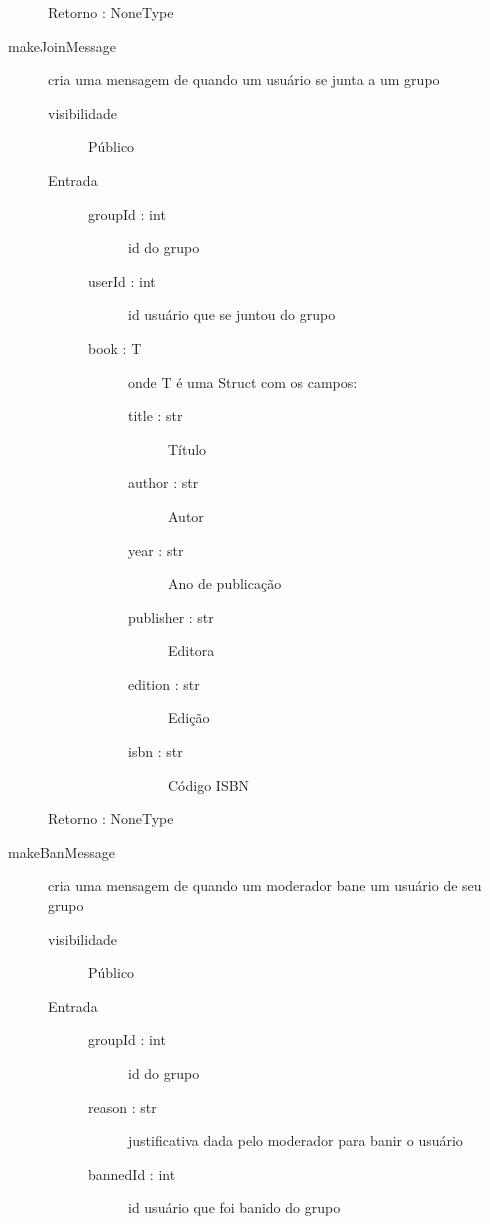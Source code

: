 \documentclass[a4paper]{article}
\begin{document}
\begin{description}
\begin{description}
				\item [Retorno : NoneType]
			\end{description} %
			
			\item [makeJoinMessage] cria uma mensagem de quando um usuário se junta a um grupo
			\begin{description} %
				\item [visibilidade] Público
				\item [Entrada] \mbox{}
					\begin{description}
					 \item [groupId : int] id do grupo
					 \item [userId : int] id usuário que se juntou do grupo
					 \item [book : T] onde T é uma Struct com os campos:
						\begin{description} 
							\item [title : str] Título
							\item [author : str] Autor
							\item [year : str] Ano de publicação
							\item [publisher : str] Editora
							\item [edition : str] Edição
							\item [isbn : str] Código ISBN
						\end{description}
					\end{description}

				\item [Retorno : NoneType]
			\end{description} %
			
			\item [makeBanMessage] cria uma mensagem de quando um moderador bane um usuário de seu grupo
			\begin{description} %
				\item [visibilidade] Público
				\item [Entrada] \mbox{}
					\begin{description}
					 \item [groupId : int] id do grupo					 
					 \item [reason : str] justificativa dada pelo moderador para banir o usuário
					 \item [bannedId : int] id usuário que foi banido do grupo
					\end{description}


\end{description}
\end{description}
\end{document}
